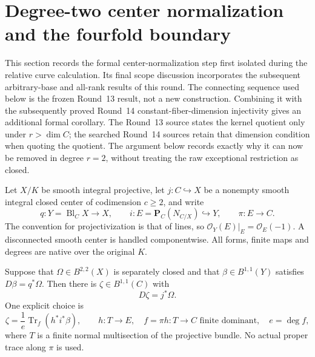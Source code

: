\section{Degree-two center normalization and the fourfold boundary}
\label{r15:higher-center-boundary}

This section records the formal center-normalization step first
isolated during the relative curve calculation.  Its final scope
discussion incorporates the subsequent arbitrary-base and all-rank
results of this round. The connecting sequence used below is the frozen Round~13
result, not a new construction. Combining it with the subsequently
proved Round~14 constant-fiber-dimension injectivity gives an additional
formal corollary. The Round~13 source states the kernel quotient only
under $r>\dim C$; the searched Round~14 sources retain that dimension
condition when quoting the quotient. The argument below records exactly
why it can now be removed in degree $r=2$, without treating the raw
exceptional restriction as closed.

Let $X/K$ be smooth integral projective, let $j:C\hookrightarrow X$
be a nonempty smooth integral closed center of codimension $c\geq2$,
and write
\[
 q:Y=\operatorname{Bl}_C X\longrightarrow X,\qquad
 i:E=\mathbf P_C(N_{C/X})\hookrightarrow Y,\qquad
 \pi:E\longrightarrow C.
\tag{HB1}
\]
The convention for projectivization is that of lines, so
$\mathcal O_Y(E)|_E=\mathcal O_E(-1)$.
A disconnected smooth center is handled componentwise. All forms,
finite maps and degrees are native over the original $K$.

\begin{lemma}
\label{r15:center-primitive}
Suppose that $\Omega\in B^{2,2}(X)$ is separately closed and that
$\beta\in B^{1,1}(Y)$ satisfies $D\beta=q^*\Omega$.
Then there is $\zeta\in B^{1,1}(C)$ with
\[
                         D\zeta=j^*\Omega.
\tag{HB2}
\]
One explicit choice is
\[
 \zeta=\frac1e\operatorname{Tr}_f(h^*i^*\beta),\qquad
 h:T\longrightarrow E,\quad f=\pi h:T\longrightarrow C
 \text{ finite dominant},\quad e=\deg f,
\tag{HB3}
\]
where $T$ is a finite normal multisection of the projective bundle.
No actual proper trace along $\pi$ is used.
\end{lemma}

